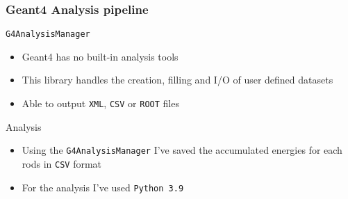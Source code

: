 \begin{frame}
\frametitle{Geant4 Analysis pipeline}

\begin{block}{\texttt{G4AnalysisManager}}
	\begin{itemize}
		\item Geant4 has no built-in analysis tools
		\item This library handles the creation, filling and I/O of user defined datasets
		\item Able to output \texttt{XML}, \texttt{CSV} or \texttt{ROOT} files
	\end{itemize}
\end{block}

\begin{exampleblock}{Analysis}
	\begin{itemize}
		\item Using the \texttt{G4AnalysisManager} I've saved the accumulated energies for each rods in \texttt{CSV} format
		\item For the analysis I've used \texttt{Python 3.9}
	\end{itemize}
\end{exampleblock}

\end{frame}